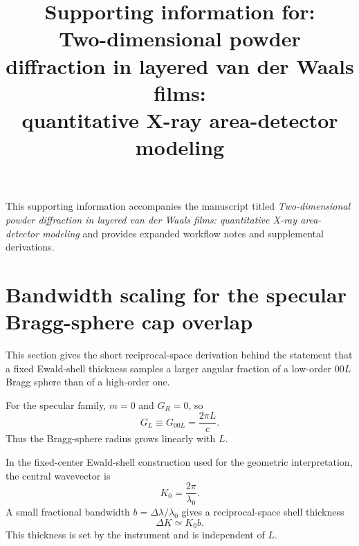 \documentclass[11pt]{article}
\title{Supporting information for:\\
Two-dimensional powder diffraction in layered van der Waals films:\\
quantitative X-ray area-detector modeling}
\author{}
\date{}
\begin{document}
\maketitle
This supporting information accompanies the manuscript titled
\emph{Two-dimensional powder diffraction in layered van der Waals films: quantitative X-ray area-detector modeling}
and provides expanded workflow notes and supplemental derivations.


\section{Bandwidth scaling for the specular Bragg-sphere cap overlap}
\label{sec:si_bandwidth_mosaic_scaling}

This section gives the short reciprocal-space derivation behind the statement that a fixed Ewald-shell thickness samples a larger angular fraction of a low-order $00L$ Bragg sphere than of a high-order one.

For the specular family, $m=0$ and $G_R=0$, so
\begin{equation}
G_L \equiv G_{00L}=\frac{2\pi L}{c}.
\end{equation}
Thus the Bragg-sphere radius grows linearly with $L$.

In the fixed-center Ewald-shell construction used for the geometric interpretation, the central wavevector is
\begin{equation}
K_0=\frac{2\pi}{\lambda_0}.
\end{equation}
A small fractional bandwidth $b=\Delta\lambda/\lambda_0$ gives a reciprocal-space shell thickness
\begin{equation}
\Delta K \simeq K_0 b.
\end{equation}
This thickness is set by the instrument and is independent of $L$.
\end{document}
